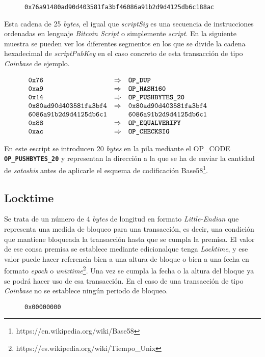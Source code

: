 \documentclass{article}
\begin{document}
    \begin{figure}[H]
        \texttt{0x76a91480ad90d403581fa3bf46086a91b2d9d4125db6c188ac}
    \end{figure}
    
    Esta cadena de 25 \textit{bytes}, el igual que \textit{scriptSig} es una secuencia de instrucciones ordenadas en lenguaje \textit{Bitcoin Script} o simplemente \textit{script}. En la siguiente muestra se pueden ver los diferentes segmentos en los que se divide la cadena hexadecimal de \textit{scriptPubKey} en el caso concreto de esta transacción de tipo \textit{Coinbase} de ejemplo.
    
    \begin{figure}[H]
        $\begin{array}{lcl}
            \texttt{0x76} & \Rightarrow & \textbf{\texttt{OP\_DUP}} \\
            \texttt{0xa9} & \Rightarrow & \textbf{\texttt{OP\_HASH160}}\\
            \texttt{0x14} & \Rightarrow & \textbf{\texttt{OP\_PUSHBYTES\_20}} \\
            \texttt{0x80ad90d403581fa3bf4} & \Rightarrow & \texttt{0x80ad90d403581fa3bf4} \\
            \texttt{6086a91b2d9d4125db6c1} & & \texttt{6086a91b2d9d4125db6c1} \\
            \texttt{0x88} & \Rightarrow & \textbf{\texttt{OP\_EQUALVERIFY}} \\
            \texttt{0xac} & \Rightarrow & \textbf{\texttt{OP\_CHECKSIG}}
        \end{array}$
    \end{figure}
    En este escript se introducen 20 \textit{bytes} en la pila mediante el OP\_CODE \textbf{\texttt{OP\_PUSHBYTES\_20}} y representan la dirección a la que se ha de enviar la cantidad de \textit{satoshis} antes de aplicarle el esquema de codificación Base58\footnote{https://en.wikipedia.org/wiki/Base58}.
    
    \subsection{Locktime}
    Se trata de un número de 4 \textit{bytes} de longitud en formato \textit{Little-Endian} que representa una medida de bloqueo para una transacción, es decir, una condición que mantiene bloqueada la transacción hasta que se cumpla la premisa. El valor  de ese consa premisa se establece mediante edicionalque tenga \textit{Locktime}, y ese valor puede hacer referencia bien a una altura de bloque o bien a una fecha en formato \textit{epoch} o \textit{unixtime}\footnote{https://es.wikipedia.org/wiki/Tiempo\_Unix}. Una vez se cumpla la fecha o la altura del bloque ya se podrá hacer uso de esa transacción. En el caso de una transacción de tipo \textit{Coinbase} no se establece ningún periodo de bloqueo.
    \begin{figure}[H]
        \texttt{0x00000000}
    \end{figure}
    
\end{document}
